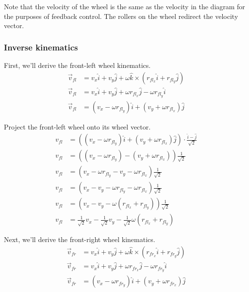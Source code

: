 Note that the velocity of the wheel is the same as the velocity in the diagram
for the purposes of feedback control. The rollers on the wheel redirect the
velocity vector.

\subsubsection{Inverse kinematics}

First, we'll derive the front-left wheel kinematics.
\begin{align*}
  \vec{v}_{fl} &= v_x \hat{i} + v_y \hat{j} +
    \omega \hat{k} \times (r_{fl_x} \hat{i} + r_{fl_y} \hat{j}) \\
  \vec{v}_{fl} &= v_x \hat{i} + v_y \hat{j} +
    \omega r_{fl_x} \hat{j} - \omega r_{fl_y} \hat{i} \\
  \vec{v}_{fl} &= (v_x - \omega r_{fl_y}) \hat{i} +
    (v_y + \omega r_{fl_x}) \hat{j}
\end{align*}

Project the front-left wheel onto its wheel vector.
\begin{align}
  v_{fl} &= ((v_x - \omega r_{fl_y}) \hat{i} + (v_y + \omega r_{fl_x}) \hat{j})
    \cdot \frac{\hat{i} - \hat{j}}{\sqrt{2}} \nonumber \\
  v_{fl} &= ((v_x - \omega r_{fl_y}) - (v_y + \omega r_{fl_x}))
    \frac{1}{\sqrt{2}} \nonumber \\
  v_{fl} &= (v_x - \omega r_{fl_y} - v_y - \omega r_{fl_x})
    \frac{1}{\sqrt{2}} \nonumber \\
  v_{fl} &= (v_x - v_y - \omega r_{fl_y} - \omega r_{fl_x})
    \frac{1}{\sqrt{2}} \nonumber \\
  v_{fl} &= (v_x - v_y - \omega (r_{fl_x} + r_{fl_y}))
    \frac{1}{\sqrt{2}} \nonumber \\
  v_{fl} &= \frac{1}{\sqrt{2}} v_x - \frac{1}{\sqrt{2}} v_y -
    \frac{1}{\sqrt{2}} \omega (r_{fl_x} + r_{fl_y})
\end{align}

Next, we'll derive the front-right wheel kinematics.
\begin{align*}
  \vec{v}_{fr} &= v_x \hat{i} + v_y \hat{j} +
    \omega \hat{k} \times (r_{fr_x} \hat{i} + r_{fr_y} \hat{j}) \\
  \vec{v}_{fr} &= v_x \hat{i} + v_y \hat{j} +
    \omega r_{fr_x} \hat{j} - \omega r_{fr_y} \hat{i} \\
  \vec{v}_{fr} &= (v_x - \omega r_{fr_y}) \hat{i} +
    (v_y + \omega r_{fr_x}) \hat{j}
\end{align*}

